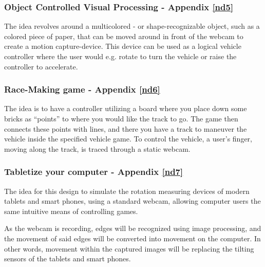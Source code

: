 \subsubsection{Object Controlled Visual Processing - Appendix \ref{nd5}}
The idea revolves around a multicolored - or shape-recognizable object, such as a colored piece of paper, that can be moved around in front of the webcam to create a motion capture-device. This device can be used as a logical vehicle controller where the user would e.g. rotate to turn the vehicle or raise the controller to accelerate.

\subsubsection{Race-Making game - Appendix \ref{nd6}}
The idea is to have a controller utilizing a board where you place down some bricks as “points” to where you would like the track to go. The game then connects these points with lines, and there you have a track to maneuver the vehicle inside the specified vehicle game. To control the vehicle, a user’s finger, moving along the track, is traced through a static webcam.

\subsubsection{Tabletize your computer - Appendix \ref{nd7}}
The idea for this design to simulate the rotation measuring devices of modern tablets and smart phones, using a standard webcam, allowing computer users the same intuitive means of controlling games.

As the webcam is recording, edges will be recognized using image processing, and the movement of said edges will be converted into movement on the computer. In other words, movement within the captured images will be replacing the tilting sensors of the tablets and smart phones.

